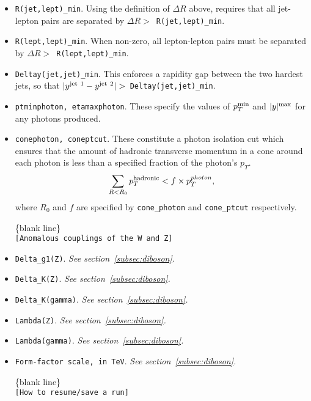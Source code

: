 \documentclass[12pt]{article}
\begin{document}
\begin{itemize}
\item {\tt R(jet,lept)\_min}. Using the definition of $\Delta R$ above,
requires that all jet-lepton pairs are separated by
$\Delta R >$~{\tt R(jet,lept)\_min}.

\item {\tt R(lept,lept)\_min}. When non-zero, all lepton-lepton pairs
must be separated by $\Delta R >$~{\tt R(lept,lept)\_min}.

\item {\tt Deltay(jet,jet)\_min}. This enforces a rapidity gap between
the two hardest jets, so that
$|y^{\rm jet~1} - y^{\rm jet~2}| >$~{\tt Deltay(jet,jet)\_min}.

\item {\tt ptminphoton, etamaxphoton}. These specify the values
of $p_T^{\rm min}$ and $|y|^{\rm max}$ for any photons produced.

\item {\tt conephoton, coneptcut}. These constitute a photon isolation
cut which ensures that the amount of hadronic
transverse momentum in a cone around each photon is less than
a specified fraction of the photon's $p_T$.
\begin{displaymath}
\sum_{R < R_0} p_T^{\rm hadronic} < f \times p_T^{photon},
\end{displaymath}
where $R_0$ and $f$ are specified by {\tt cone\_photon} and
{\tt cone\_ptcut} respectively.

\begin{center}
\{blank line\} \\
{\tt [Anomalous couplings of the W and Z] }
\end{center}

\item {\tt Delta\_g1(Z)}. {\it See section~\ref{subsec:diboson}.}
\item {\tt Delta\_K(Z)}. {\it See section~\ref{subsec:diboson}.}
\item {\tt Delta\_K(gamma)}. {\it See section~\ref{subsec:diboson}.}
\item {\tt Lambda(Z)}. {\it See section~\ref{subsec:diboson}.}
\item {\tt Lambda(gamma)}. {\it See section~\ref{subsec:diboson}.}
\item {\tt Form-factor scale, in TeV}. {\it See section~\ref{subsec:diboson}.}

\begin{center}
\{blank line\} \\
{\tt [How to resume/save a run] }
\end{center}


\end{itemize}
\end{document}
